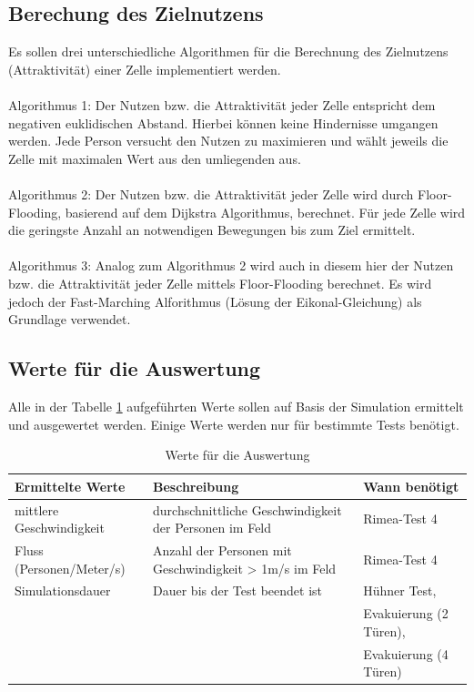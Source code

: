 \subsection{Berechung des Zielnutzens}
\label{AnforderungenAlgorithmen}

Es sollen drei unterschiedliche Algorithmen für die Berechnung des Zielnutzens (Attraktivität) einer Zelle implementiert werden. \\
\\
Algorithmus 1: Der Nutzen bzw. die Attraktivität jeder Zelle entspricht dem negativen euklidischen Abstand. Hierbei können keine Hindernisse umgangen werden. Jede Person versucht den Nutzen zu maximieren und wählt jeweils die Zelle mit maximalen Wert aus den umliegenden aus.\\
\\
Algorithmus 2: Der Nutzen bzw. die Attraktivität jeder Zelle wird durch Floor-Flooding, basierend auf dem Dijkstra Algorithmus, berechnet. Für jede Zelle wird die geringste Anzahl an notwendigen Bewegungen bis zum Ziel ermittelt. \\
\\
Algorithmus 3: Analog zum Algorithmus 2 wird auch in diesem hier der Nutzen bzw. die Attraktivität jeder Zelle mittels Floor-Flooding berechnet. Es wird jedoch der Fast-Marching Alforithmus (Lösung der Eikonal-Gleichung) als Grundlage verwendet.

\subsection{Werte für die Auswertung}
Alle in der Tabelle \ref{tab:WerteAuswertung} aufgeführten Werte sollen auf Basis der Simulation ermittelt und ausgewertet werden. Einige Werte werden nur für bestimmte Tests benötigt.
\begin{table}[htpb]
	\centering
	\begin{tabular}{lll}
		Ermittelte Werte & Beschreibung & Wann benötigt\\ \hline
		mittlere Geschwindigkeit & durchschnittliche Geschwindigkeit der Personen im Feld & Rimea-Test 4 \\	
		Fluss (Personen/Meter/s) & Anzahl der Personen mit Geschwindigkeit > 1m/s im Feld & Rimea-Test 4\\
		Simulationsdauer & Dauer bis der Test beendet ist & Hühner Test, \\&& Evakuierung (2 Türen), \\&& Evakuierung (4 Türen)\\
	\end{tabular}
	\caption{Werte für die Auswertung}
	\label{tab:WerteAuswertung}
\end{table}


